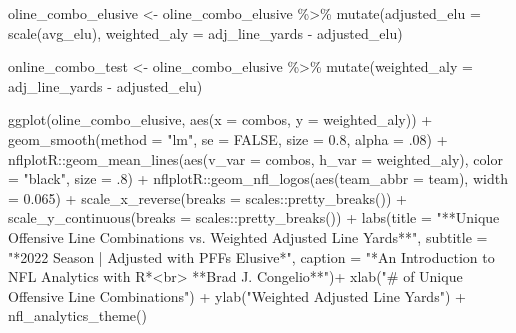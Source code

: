 \documentclass[
  letterpaper,
]{krantz}
\newenvironment{Shaded}{\begin{snugshade}}{\end{snugshade}}
\newcommand{\AttributeTok}[1]{\textcolor[rgb]{0.40,0.45,0.13}{#1}}
\newcommand{\ConstantTok}[1]{\textcolor[rgb]{0.56,0.35,0.01}{#1}}
\newcommand{\DecValTok}[1]{\textcolor[rgb]{0.68,0.00,0.00}{#1}}
\newcommand{\FloatTok}[1]{\textcolor[rgb]{0.68,0.00,0.00}{#1}}
\newcommand{\FunctionTok}[1]{\textcolor[rgb]{0.28,0.35,0.67}{#1}}
\newcommand{\NormalTok}[1]{\textcolor[rgb]{0.00,0.23,0.31}{#1}}
\newcommand{\OtherTok}[1]{\textcolor[rgb]{0.00,0.23,0.31}{#1}}
\newcommand{\SpecialCharTok}[1]{\textcolor[rgb]{0.37,0.37,0.37}{#1}}
\newcommand{\StringTok}[1]{\textcolor[rgb]{0.13,0.47,0.30}{#1}}
\begin{document}
\begin{Shaded}
\begin{Highlighting}[]
\NormalTok{oline\_combo\_elusive }\OtherTok{\textless{}{-}}\NormalTok{ oline\_combo\_elusive }\SpecialCharTok{\%\textgreater{}\%}
  \FunctionTok{mutate}\NormalTok{(}\AttributeTok{adjusted\_elu =} \FunctionTok{scale}\NormalTok{(avg\_elu),}
         \AttributeTok{weighted\_aly =}\NormalTok{ adj\_line\_yards }\SpecialCharTok{{-}}\NormalTok{ adjusted\_elu)}

\NormalTok{online\_combo\_test }\OtherTok{\textless{}{-}}\NormalTok{ oline\_combo\_elusive }\SpecialCharTok{\%\textgreater{}\%}
  \FunctionTok{mutate}\NormalTok{(}\AttributeTok{weighted\_aly =}\NormalTok{ adj\_line\_yards }\SpecialCharTok{{-}}\NormalTok{ adjusted\_elu)}

\FunctionTok{ggplot}\NormalTok{(oline\_combo\_elusive, }\FunctionTok{aes}\NormalTok{(}\AttributeTok{x =}\NormalTok{ combos, }\AttributeTok{y =}\NormalTok{ weighted\_aly)) }\SpecialCharTok{+}
  \FunctionTok{geom\_smooth}\NormalTok{(}\AttributeTok{method =} \StringTok{"lm"}\NormalTok{, }\AttributeTok{se =} \ConstantTok{FALSE}\NormalTok{, }\AttributeTok{size =} \FloatTok{0.8}\NormalTok{, }\AttributeTok{alpha =}\NormalTok{ .}\DecValTok{08}\NormalTok{) }\SpecialCharTok{+}
\NormalTok{  nflplotR}\SpecialCharTok{::}\FunctionTok{geom\_mean\_lines}\NormalTok{(}\FunctionTok{aes}\NormalTok{(}\AttributeTok{v\_var =}\NormalTok{ combos, }\AttributeTok{h\_var =}\NormalTok{ weighted\_aly),}
                            \AttributeTok{color =} \StringTok{"black"}\NormalTok{, }\AttributeTok{size =}\NormalTok{ .}\DecValTok{8}\NormalTok{) }\SpecialCharTok{+}
\NormalTok{  nflplotR}\SpecialCharTok{::}\FunctionTok{geom\_nfl\_logos}\NormalTok{(}\FunctionTok{aes}\NormalTok{(}\AttributeTok{team\_abbr =}\NormalTok{ team), }\AttributeTok{width =} \FloatTok{0.065}\NormalTok{) }\SpecialCharTok{+}
  \FunctionTok{scale\_x\_reverse}\NormalTok{(}\AttributeTok{breaks =}\NormalTok{ scales}\SpecialCharTok{::}\FunctionTok{pretty\_breaks}\NormalTok{()) }\SpecialCharTok{+}
  \FunctionTok{scale\_y\_continuous}\NormalTok{(}\AttributeTok{breaks =}\NormalTok{ scales}\SpecialCharTok{::}\FunctionTok{pretty\_breaks}\NormalTok{()) }\SpecialCharTok{+}
  \FunctionTok{labs}\NormalTok{(}\AttributeTok{title =} \StringTok{"**Unique Offensive Line Combinations vs.}
\StringTok{       Weighted Adjusted Line Yards**"}\NormalTok{,}
       \AttributeTok{subtitle =} \StringTok{"*2022 Season  |  Adjusted with PFF\textquotesingle{}s \textquotesingle{}Elusive\textquotesingle{}*"}\NormalTok{,}
       \AttributeTok{caption =} \StringTok{"*An Introduction to NFL Analytics with R*\textless{}br\textgreater{}}
\StringTok{       **Brad J. Congelio**"}\NormalTok{)}\SpecialCharTok{+}
  \FunctionTok{xlab}\NormalTok{(}\StringTok{"\# of Unique Offensive Line Combinations"}\NormalTok{) }\SpecialCharTok{+}
  \FunctionTok{ylab}\NormalTok{(}\StringTok{"Weighted Adjusted Line Yards"}\NormalTok{) }\SpecialCharTok{+}
  \FunctionTok{nfl\_analytics\_theme}\NormalTok{()}
\end{Highlighting}
\end{Shaded}
\end{document}
